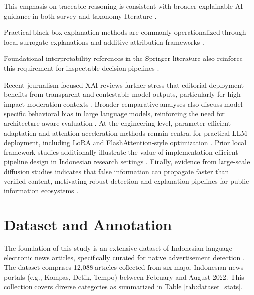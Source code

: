 \documentclass{ieeeaccess}
\begin{document}
This emphasis on traceable reasoning is consistent with broader explainable-AI guidance in both survey and taxonomy literature \cite{b49, b51}.

Practical black-box explanation methods are commonly operationalized through local surrogate explanations and additive attribution frameworks \cite{b64, b63}.

Foundational interpretability references in the Springer literature also reinforce this requirement for inspectable decision pipelines \cite{b59}.

Recent journalism-focused XAI reviews further stress that editorial deployment benefits from transparent and contestable model outputs, particularly for high-impact moderation contexts \cite{b20}. Broader comparative analyses also discuss model-specific behavioral bias in large language models, reinforcing the need for architecture-aware evaluation \cite{b24}. At the engineering level, parameter-efficient adaptation and attention-acceleration methods remain central for practical LLM deployment, including LoRA and FlashAttention-style optimization \cite{b36, b37}. Prior local framework studies additionally illustrate the value of implementation-efficient pipeline design in Indonesian research settings \cite{b48}. Finally, evidence from large-scale diffusion studies indicates that false information can propagate faster than verified content, motivating robust detection and explanation pipelines for public information ecosystems \cite{b65}.

\section{Dataset and Annotation}
\label{sec:dataset}
The foundation of this study is an extensive dataset of Indonesian-language electronic news articles, specifically curated for native advertisement detection \cite{b17}. The dataset comprises 12,088 articles collected from six major Indonesian news portals (e.g., Kompas, Detik, Tempo) between February and August 2022. This collection covers diverse categories as summarized in Table \ref{tab:dataset_stats}.
\end{document}
